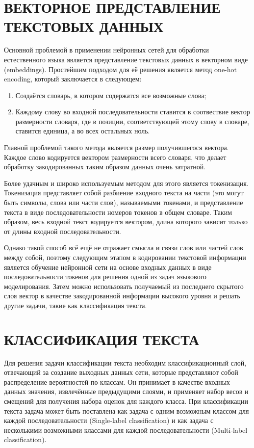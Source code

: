\section{ВЕКТОРНОЕ ПРЕДСТАВЛЕНИЕ ТЕКСТОВЫХ ДАННЫХ}
Основной проблемой в применении нейронных сетей для обработки естественного языка является представление текстовых данных в векторном виде (embeddings). Простейшим подходом для её решения является метод one-hot encoding, который заключается в следующем:
\begin{enumerate}
    \item Создаётся словарь, в котором содержатся все возможные слова;
    \item Каждому слову во входной последовательности ставится в соотвествие вектор размерности словаря, где в позиции, соответствующей этому слову в словаре, ставится единица, а во всех остальных ноль.
\end{enumerate}
Главной проблемой такого метода является размер получившегося вектора. Каждое слово кодируется вектором размерности всего словаря, что делает обработку закодированных таким образом данных очень затратной.

Более удачным и широко используемым методом для этого является токенизация. Токенизация представляет собой разбиение входного текста на части  (это могут быть символы, слова или части слов), называемыми токенами, и представление текста в виде последовательности номеров токенов в общем словаре. Таким образом, весь входной текст кодируется вектором, длина которого зависит только от длины входной последовательности. 

Однако такой способ всё ещё не отражает смысла и связи слов или частей слов между собой, поэтому следующим этапом в кодировании текстовой информации является обучение нейронной сети на основе входных данных в виде последовательности токенов для решения одной из задач языкового моделирования. Затем можно использовать получаемый из последнего скрытого слоя вектор в качестве закодированной информации высокого уровня и решать другие задачи, такие как классификация текста.
\section{КЛАССИФИКАЦИЯ ТЕКСТА}
Для решения задачи классификации текста необходим классификационный слой, отвечающий за создание выходных данных сети, которые представляют собой распределение вероятностей по классам. Он принимает в качестве входных данных значения, извлечённые предыдущими слоями, и применяет набор весов и смещений для получения набора оценок для каждого класса. При классификации текста задача может быть поставлена как задача с одним возможным классом для каждой последовательности (Single-label classification) и как задача с несколькими возможными классами для каждой последовательности (Multi-label classification).

